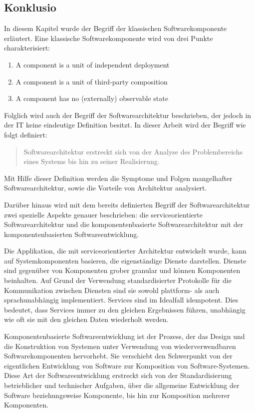 \subsection{Konklusio}
\label{sec:2_Konklusion}

In diesem Kapitel wurde der Begriff der klassischen Softwarekomponente erläutert. Eine klassische Softwarekomponente wird von drei Punkte charakterisiert:
\begin{enumerate}
\item A component is a unit of independent deployment
\item A component is a unit of third-party composition
\item A component has no (externally) observable state
\end{enumerate}

Folglich wird auch der Begriff der Softwarearchitektur beschrieben, der jedoch in der IT keine eindeutige Definition besitzt. In dieser Arbeit wird der Begriff wie folgt definiert:
\begin{quote}
Softwarearchitektur erstreckt sich von der Analyse des Problembereichs eines Systems bis hin zu seiner Realisierung.
\end{quote}

Mit Hilfe dieser Definition werden die Symptome und Folgen mangelhafter Softwarearchitektur, sowie die Vorteile von Architektur analysiert.

Darüber hinaus wird mit dem bereits definierten Begriff der Softwarearchitektur zwei spezielle Aspekte genauer beschrieben: die serviceorientierte Softwarearchitektur und die komponentenbasierte Softwarearchitektur mit der komponentenbasierten Softwareentwicklung.

Die Applikation, die mit serviceorientierter Architektur entwickelt wurde, kann auf Systemkomponenten basieren, die eigenständige Dienste darstellen. Dienste sind gegenüber von Komponenten grober granular und können Komponenten beinhalten. Auf Grund der Verwendung standardisierter Protokolle für die Kommunikation zwischen Diensten sind sie sowohl plattform- als auch sprachunabhängig implementiert. Services sind im Idealfall idempotent. Dies bedeutet, dass Services immer zu den gleichen Ergebnissen führen, unabhängig wie oft sie mit den gleichen Daten wiederholt werden.

Komponentenbasierte Softwareentwicklung ist der Prozess, der das Design und die Konstruktion von Systemen unter Verwendung von wiederverwendbaren Softwarekomponenten hervorhebt. Sie verschiebt den Schwerpunkt von der eigentlichen Entwicklung von Software zur Komposition von Software-Systemen. Diese Art der Softwareentwicklung erstreckt sich von der Standardisierung betrieblicher und technischer Aufgaben, über die allgemeine Entwicklung der Software beziehungsweise Komponente, bis hin zur Komposition mehrerer Komponenten.

